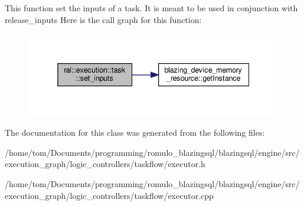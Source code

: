 This function set the inputs of a task. It is meant to be used in conjunction with release\+\_\+inputs Here is the call graph for this function\+:\nopagebreak
\begin{figure}[H]
\begin{center}
\leavevmode
\includegraphics[width=338pt]{classral_1_1execution_1_1task_a9d1c2ebe66d6ada25cc1eccb246774b9_cgraph}
\end{center}
\end{figure}


The documentation for this class was generated from the following files\+:\begin{DoxyCompactItemize}
\item 
/home/tom/\+Documents/programming/romulo\+\_\+blazingsql/blazingsql/engine/src/execution\+\_\+graph/logic\+\_\+controllers/taskflow/executor.\+h\item 
/home/tom/\+Documents/programming/romulo\+\_\+blazingsql/blazingsql/engine/src/execution\+\_\+graph/logic\+\_\+controllers/taskflow/executor.\+cpp\end{DoxyCompactItemize}
